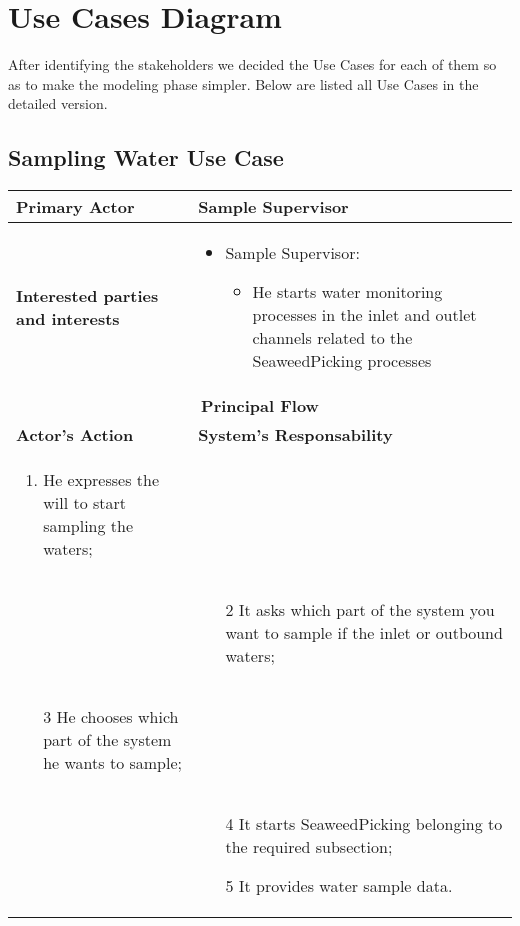 \newpage \chapter{\textbf{Use Cases Diagram}}

After identifying the stakeholders we decided the Use Cases for each of them so as to make the modeling phase simpler. Below are listed all Use Cases in the detailed version.

\section{Sampling Water Use Case}

\begin{longtable}{|p{7cm}|p{7cm}|}

\hline
\textbf{Primary Actor}  & Sample Supervisor\\


\hline
\textbf{Interested parties and interests} &
\begin{itemize}
\item Sample Supervisor:
	\begin{itemize}
 	\item He starts water monitoring processes in the inlet and outlet channels related 	to the SeaweedPicking processes

	\end{itemize}
\end{itemize}
\\


\hline
\multicolumn{2}{|c|}{\textbf{Principal Flow}} \\

\hline
\textbf{Actor's Action} & \textbf{System's Responsability}\\

\hline

\begin{enumerate}
\item He expresses the will to start sampling the waters;
\end{enumerate} &\\

& 
\begin{enumerate}
\item[2]It asks which part of the system you want to sample if the inlet or outbound waters;
\end{enumerate}\\

\begin{enumerate}
\item[3]He chooses which part of the system he wants to sample;			
\end{enumerate} &\\


& 
\begin{enumerate}
\item[4]It starts SeaweedPicking belonging to the required subsection;
\item[5]It provides water sample data.
\end{enumerate}\\

\hline
\end{longtable}


